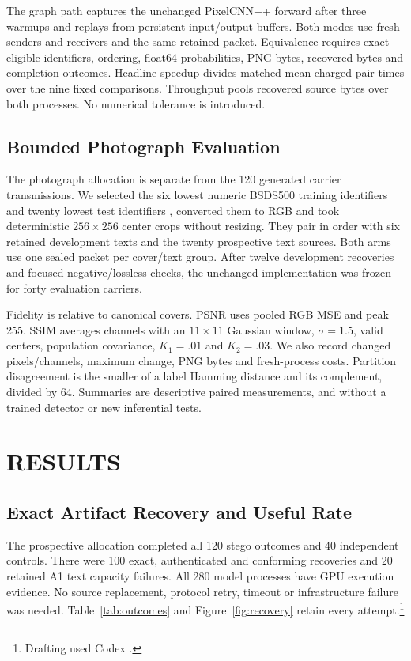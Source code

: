 \documentclass[a4paper,twoside]{article}
\newcommand{\aifootnote}{\footnote{Drafting used Codex \cite{codex}.}}
\begin{document}
The graph path captures the unchanged PixelCNN++ forward after three warmups and replays from persistent input/output buffers. Both modes use fresh senders and receivers and the same retained packet. Equivalence requires exact eligible identifiers, ordering, float64 probabilities, PNG bytes, recovered bytes and completion outcomes. Headline speedup divides matched mean charged pair times over the nine fixed comparisons. Throughput pools recovered source bytes over both processes. No numerical tolerance is introduced.

\space

\subsection{Bounded Photograph Evaluation}
The photograph allocation is separate from the 120 generated carrier transmissions. We selected the six lowest numeric BSDS500 training identifiers and twenty lowest test identifiers \cite{bsds}, converted them to RGB and took deterministic $256\times256$ center crops without resizing. They pair in order with six retained development texts and the twenty prospective text sources. Both arms use one sealed packet per cover/text group. After twelve development recoveries and focused negative/lossless checks, the unchanged implementation was frozen for forty evaluation carriers.

Fidelity is relative to canonical covers. PSNR uses pooled RGB MSE and peak 255. SSIM averages channels with an $11\times11$ Gaussian window, $\sigma=1.5$, valid centers, population covariance, $K_1=.01$ and $K_2=.03$. We also record changed pixels/channels, maximum change, PNG bytes and fresh-process costs. Partition disagreement is the smaller of a label Hamming distance and its complement, divided by 64. Summaries are descriptive paired measurements, and without a trained detector or new inferential tests.

\space

\section{\uppercase{Results}}
\label{sec:results}
\subsection{Exact Artifact Recovery and Useful Rate}
The prospective allocation completed all 120 stego outcomes and 40 independent controls. There were 100 exact, authenticated and conforming recoveries and 20 retained A1 text capacity failures. All 280 model processes have GPU execution evidence. No source replacement, protocol retry, timeout or infrastructure failure was needed. Table~\ref{tab:outcomes} and Figure~\ref{fig:recovery} retain every attempt.\aifootnote
\end{document}
